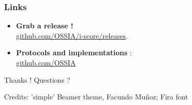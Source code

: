 \documentclass{beamer}
\begin{document}
\begin{frame}
    \frametitle{Links}
    \begin{itemize}
        \item \textbf{Grab a release !} ~\\ \url{github.com/OSSIA/i-score/releases}. 
        \item \textbf{Protocols and implementations} :~\\
        \url{github.com/OSSIA}
    \end{itemize}
        
    \centering
    \vspace{2cm}
    \Large{Thanks ! Questions ?}
    \vspace{2cm}
    
    \small{Credits: 'simple' Beamer theme, Facundo Muñoz; Fira font}
\end{frame}    
\end{document}
